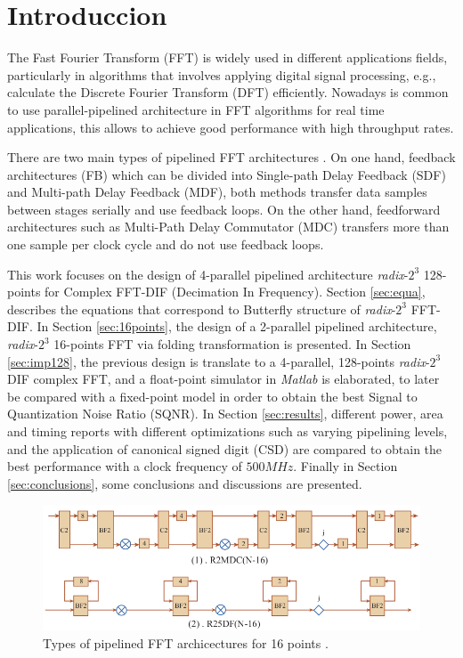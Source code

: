 \documentclass[journal,comsoc]{IEEEtran}
\begin{document}
\section{Introduccion}

The Fast Fourier Transform (FFT) is widely used in different applications fields, particularly in algorithms that involves applying digital signal processing, e.g., calculate the Discrete Fourier Transform (DFT) efficiently. Nowadays is common to use parallel-pipelined architecture in FFT algorithms for real time applications, this allows to achieve good performance with high throughput rates.

There are two main types of pipelined FFT architectures  \cite{shousheng_he_designing_1998}. On one hand, feedback architectures (FB) which can be divided into Single-path Delay Feedback (SDF) and Multi-path Delay Feedback (MDF), both methods transfer data samples between stages serially and use feedback loops. On the other hand, feedforward architectures such as Multi-Path Delay Commutator (MDC) transfers more than one sample per clock cycle and do not use feedback loops.

This work focuses on the design of 4-parallel pipelined architecture \textit{radix}-$2^3$ 128-points for Complex FFT-DIF (Decimation In Frequency). Section \ref{sec:equa}, describes the equations that correspond to Butterfly structure of \textit{radix}-$2^3$ FFT-DIF. In Section \ref{sec:16points}, the design of a 2-parallel pipelined architecture, \textit{radix}-$2^3$ 16-points FFT via folding transformation is presented. In Section \ref{sec:imp128}, the previous design is translate to a 4-parallel, 128-points \textit{radix}-$2^3$ DIF complex FFT, and a float-point simulator in \textit{Matlab} is elaborated, to later be compared with a fixed-point model in order to obtain the best Signal to Quantization Noise Ratio (SQNR).
In Section \ref{sec:results}, different power, area and timing reports with different optimizations such as varying pipelining levels, and the application of canonical signed digit (CSD) are compared to obtain the best performance with a clock frequency of $500MHz$. Finally in Section \ref{sec:conclusions}, some conclusions and discussions are presented.  


\begin{figure} 
	\centering
	\includegraphics[width=1\linewidth]{Diagramas/types_FFT.png}
	\caption{Types of pipelined FFT archicectures for 16 points \cite{type_FFT_MIT}.}
	\label{fig:types_fft}
\end{figure}
\end{document}
